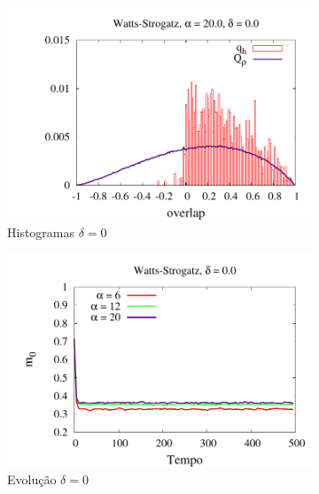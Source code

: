 \begin{figure}
    \centering
    \begin{subfigure}[]{0.7\textwidth}
        \centering
        \includegraphics[width=\textwidth]{Figures/HistoDeltaD0Beta20}
        \caption{Histogramas $\delta = 0$}
    \end{subfigure}
    \begin{subfigure}[]{0.7\textwidth}
        \centering
        \includegraphics[width=\textwidth]{Figures/MagD0Beta}
        \caption{Evolução $\delta = 0$}
    \end{subfigure}
    \begin{subfigure}[]{0.7\textwidth}
        \centering

\end{subfigure}
\end{figure}
